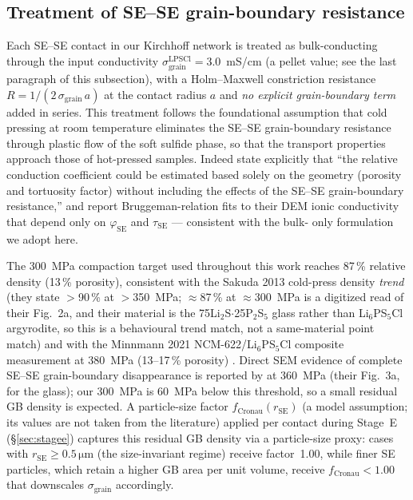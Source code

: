 \documentclass[11pt, a4paper]{article}
\begin{document}
\subsection{Treatment of SE--SE grain-boundary resistance}
\label{sec:se-gb}
Each SE--SE contact in our Kirchhoff network is treated as
bulk-conducting through the input conductivity
$\sigma_{\mathrm{grain}}^{\mathrm{LPSCl}} = 3.0$~mS/cm
(a pellet value; see the last paragraph of this subsection), with a Holm--Maxwell constriction resistance
$R = 1/(2\,\sigma_{\mathrm{grain}}\,a)$ \citep{Holm1967} at the
contact radius $a$ and \emph{no explicit grain-boundary term} added
in series.  This treatment follows the foundational assumption
\citep{Sakuda2013, So2021, Koerver2017a} that cold pressing at room
temperature eliminates the SE--SE grain-boundary resistance through
plastic flow of the soft sulfide phase, so that the transport
properties approach those of hot-pressed samples.  Indeed
\citet{So2021} state explicitly that ``the relative conduction
coefficient could be estimated based solely on the geometry
(porosity and tortuosity factor) without including the effects of
the SE--SE grain-boundary resistance,'' and report Bruggeman-relation
fits to their DEM ionic conductivity that depend only on $\varphi_{
\mathrm{SE}}$ and $\tau_{\mathrm{SE}}$ --- consistent with the bulk-
only formulation we adopt here.

The 300~MPa compaction target used throughout this work reaches
87\,\% relative density (13\,\% porosity), consistent with the Sakuda
2013 cold-press density \emph{trend} \citep{Sakuda2013} (they state
$>$90\,\% at $>$350~MPa; $\approx$87\,\% at $\approx$300~MPa is a digitized
read of their Fig.~2a, and their material is the 75Li$_2$S$\cdot$25P$_2$S$_5$
glass rather than Li$_6$PS$_5$Cl argyrodite, so this is a behavioural
trend match, not a same-material point match) and with the Minnmann 2021
NCM-622/Li$_6$PS$_5$Cl composite measurement at 380~MPa (13--17\,\%
porosity) \citep{Minnmann2021bottleneck}.  Direct SEM evidence of complete
SE--SE grain-boundary disappearance is reported by \citet{Sakuda2013} at
360~MPa (their Fig.~3a, for the glass); our 300~MPa is 60~MPa below this
threshold, so a small residual GB density is expected.  A particle-size
factor $f_{\mathrm{Cronau}}(r_{\mathrm{SE}})$ (a model assumption; its values
are not taken from the literature) applied per contact
during Stage~E (\S\ref{sec:stagee}) captures this
residual GB density via a particle-size proxy: cases with
$r_{\mathrm{SE}} \ge 0.5\,\si{\micro\metre}$ (the size-invariant
regime) receive factor~1.00, while finer SE particles, which retain
a higher GB area per unit volume, receive $f_{\mathrm{Cronau}} <
1.00$ that downscales $\sigma_{\mathrm{grain}}$ accordingly.
\end{document}

